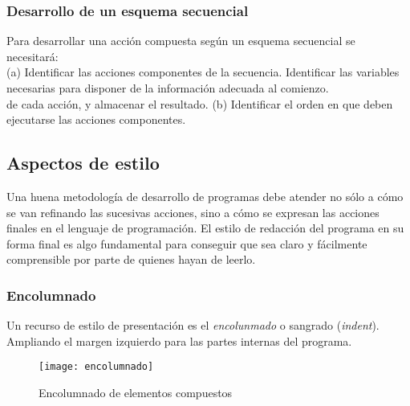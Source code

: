 \documentclass[11pt,a4paper]{article}
\begin{document}
 \subsubsection{Desarrollo de un esquema secuencial}
 Para desarrollar una acción compuesta según un 
 esquema secuencial se necesitará:\\ 
 (a) Identificar las acciones componentes de la secuencia. Identificar las variables necesarias para disponer de la información adecuada al comienzo. \\
 de cada acción, y almacenar el resultado. 
 (b) Identificar el orden en que deben ejecutarse las acciones componentes.
 
 \subsection{Aspectos de estilo}
  Una huena metodología de desarrollo de programas debe atender no sólo a 
  cómo se van refinando las sucesivas acciones, sino a cómo se expresan las 
  acciones finales en el lenguaje de programación. El estilo de redacción del 
  programa en su forma final es algo fundamental para conseguir que sea claro 
  y fácilmente comprensible por parte de quienes hayan de leerlo. 
  \subsubsection{Encolumnado}
  Un recurso de estilo de presentación es el \textit{encolunmado} o sangrado (\textit{indent}). 
   Ampliando el margen izquierdo para las partes internas del programa.
 \begin{figure}[htb]
 	\centering
 	\texttt{[image: encolumnado]}
 	\caption{Encolumnado de elementos compuestos}
 	\label{fig:Encolumnado}
 \end{figure}
 
\end{document}
